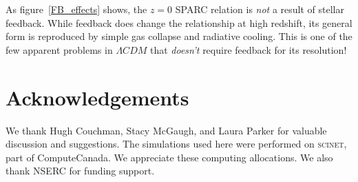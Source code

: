 As figure~\ref{FB_effects} shows, the $z=0$ SPARC relation is {\it not} a result of
stellar feedback.  While feedback does change the relationship at high redshift,
its general form is reproduced by simple gas collapse and radiative cooling.
This is one of the few apparent problems in $\Lambda CDM$ that {\it doesn't}
require feedback for its resolution!

\section*{Acknowledgements}
We thank Hugh Couchman, Stacy McGaugh, and Laura Parker for valuable discussion and suggestions.
The simulations used here were performed on \textsc{scinet}, part of
ComputeCanada.  We appreciate these computing allocations.  We also thank NSERC
for funding support.



